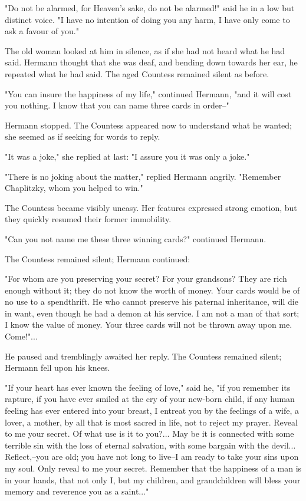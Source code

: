 "Do not be alarmed, for Heaven's sake, do not be alarmed!" said he in
a low but distinct voice. "I have no intention of doing you any harm,
I have only come to ask a favour of you."

The old woman looked at him in silence, as if she had not heard what
he had said. Hermann thought that she was deaf, and bending down
towards her ear, he repeated what he had said. The aged Countess
remained silent as before.

"You can insure the happiness of my life," continued Hermann, "and it
will cost you nothing. I know that you can name three cards in
order--"

Hermann stopped. The Countess appeared now to understand what he
wanted; she seemed as if seeking for words to reply.

"It was a joke," she replied at last: "I assure you it was only a
joke."

"There is no joking about the matter," replied Hermann angrily.
"Remember Chaplitzky, whom you helped to win."

The Countess became visibly uneasy. Her features expressed strong
emotion, but they quickly resumed their former immobility.

"Can you not name me these three winning cards?" continued Hermann.

The Countess remained silent; Hermann continued:

"For whom are you preserving your secret? For your grandsons? They are
rich enough without it; they do not know the worth of money. Your
cards would be of no use to a spendthrift. He who cannot preserve his
paternal inheritance, will die in want, even though he had a demon at
his service. I am not a man of that sort; I know the value of money.
Your three cards will not be thrown away upon me. Come!"...

He paused and tremblingly awaited her reply. The Countess remained
silent; Hermann fell upon his knees.

"If your heart has ever known the feeling of love," said he, "if you
remember its rapture, if you have ever smiled at the cry of your
new-born child, if any human feeling has ever entered into your
breast, I entreat you by the feelings of a wife, a lover, a mother, by
all that is most sacred in life, not to reject my prayer. Reveal to me
your secret. Of what use is it to you?... May be it is connected with
some terrible sin with the loss of eternal salvation, with some
bargain with the devil... Reflect,--you are old; you have not long to
live--I am ready to take your sins upon my soul. Only reveal to me
your secret. Remember that the happiness of a man is in your hands,
that not only I, but my children, and grandchildren will bless your
memory and reverence you as a saint..."

